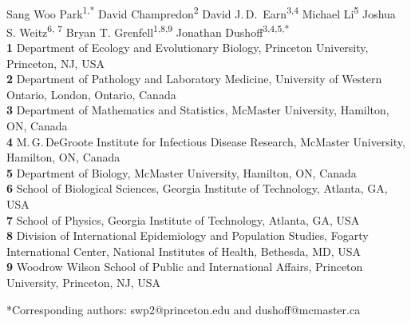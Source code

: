 \documentclass[12pt]{article}
\date{\today}
\begin{document}
\begin{flushleft}{
	\Large
	\textbf{}
}
\newline
\\
Sang Woo Park\textsuperscript{1,*}
David Champredon\textsuperscript{2}
David J.\,D.\ Earn\textsuperscript{3,4}
Michael Li\textsuperscript{5}
Joshua S. Weitz\textsuperscript{6, 7}
Bryan T. Grenfell\textsuperscript{1,8,9}
Jonathan Dushoff\textsuperscript{3,4,5,*}
\\
\bigskip
\textbf{1} Department of Ecology and Evolutionary Biology, Princeton University, Princeton, NJ, USA
\\
\textbf{2} Department of Pathology and Laboratory Medicine, University of Western Ontario, London, Ontario, Canada
\\
\textbf{3} Department of Mathematics and Statistics, McMaster University, Hamilton, ON, Canada
\\
\textbf{4} M.\,G.\,DeGroote Institute for Infectious Disease Research, McMaster University, Hamilton, ON, Canada
\\
\textbf{5} Department of Biology, McMaster University, Hamilton, ON, Canada
\\
\textbf{6} School of Biological Sciences, Georgia Institute of Technology, Atlanta, GA, USA
\\
\textbf{7} School of Physics, Georgia Institute of Technology, Atlanta, GA, USA
\\
\textbf{8} Division of International Epidemiology and Population Studies, Fogarty International Center, National Institutes of Health, Bethesda, MD, USA
\\
\textbf{9} Woodrow Wilson School of Public and International Affairs, Princeton University, Princeton, NJ, USA
\\
\bigskip

*Corresponding authors: swp2@princeton.edu and dushoff@mcmaster.ca
\end{flushleft}
\end{document}
